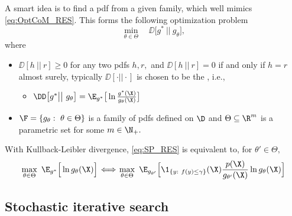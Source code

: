 		A smart idea is to find a pdf from a given family, which well mimics 
		\eqref{eq:OptCoM_RES}. This forms the following optimization
		problem
		\begin{equation}\label{eq:SP_RES}
		\min_{\theta\in \Theta}\quad  \DD\Big[g^*\ \Big|\Big|\ g_{\theta}\Big],
		\end{equation}
		where 
		\begin{itemize}
			\item $\DD[h\ ||\ r]\ge 0$ for any two pdfs $h,r,$ and  $\DD[h \ || \ r]=0$ if and only if $h=r$ almost surely,
			typically $\DD[\cdot ||\cdot]$ is chosen to be the , i.e.,
			\begin{itemize}\label{eq:KL-distance}
				\item $\DD\big[g^*\big|\big|\ g_{\theta}\big]=\E_{g^*}\big[\ln \frac{g^*(\X)}{g_{\theta}(\X)}\big]$
			\end{itemize}
			\item $\F=\{g_{\theta}:\ \theta\in \Theta\}$ is a family of pdfs 
			defined on $\D$ and $\Theta\subseteq \R^m$ is a  
			parametric set for some $m\in \N_+.$ 
		\end{itemize}
		With Kullback-Leibler divergence, \eqref{eq:SP_RES} is equivalent to, for  $\theta'\in \Theta,$
		\begin{equation}\label{eq:SP_RES_KL}
			\max_{\theta \in \Theta}\ \E_{g^*} \Big[ \ln g_{\theta}(\X)\Big]
			\!\iff\! \max_{\theta \in \Theta}\ \E_{g_{\theta'}} \Big[\1_{\{y:\ f(y)\le \gamma\}}(\X)\frac{p(\X)}{g_{\theta'}(\X)} \ln g_{\theta}(\X)\Big]
		\end{equation}

		\subsection{Stochastic iterative search}

